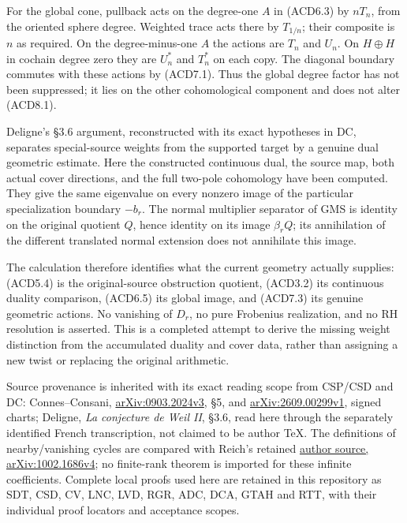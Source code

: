 For the global cone, pullback acts on the degree-one \(A\) in (ACD6.3)
by \(nT_n\), from the oriented sphere degree. Weighted trace acts there
by \(T_{1/n}\); their composite is \(n\) as required. On the
degree-minus-one \(A\) the actions are \(T_n\) and \(U_n\). On
\(H\oplus H\) in cochain degree zero they are \(U_n^*\) and \(T_n^*\) on
each copy. The diagonal boundary commutes with these actions by
(ACD7.1). Thus the global degree factor has not been suppressed; it lies
on the other cohomological component and does not alter (ACD8.1).

Deligne's §3.6 argument, reconstructed with its exact hypotheses in DC,
separates special-source weights from the supported target by a genuine
dual geometric estimate. Here the constructed continuous dual, the
source map, both actual cover directions, and the full two-pole
cohomology have been computed. They give the same eigenvalue on every
nonzero image of the particular specialization boundary \(-b_r\). The
normal multiplier separator of GMS is identity on the original quotient
\(Q\), hence identity on its image \(\beta_rQ\); its annihilation of the
different translated normal extension does not annihilate this image.

The calculation therefore identifies what the current geometry actually
supplies: (ACD5.4) is the original-source obstruction quotient, (ACD3.2)
its continuous duality comparison, (ACD6.5) its global image, and
(ACD7.3) its genuine geometric actions. No vanishing of \(D_r\), no pure
Frobenius realization, and no RH resolution is asserted. This is a
completed attempt to derive the missing weight distinction from the
accumulated duality and cover data, rather than assigning a new twist or
replacing the original arithmetic.

Source provenance is inherited with its exact reading scope from CSP/CSD
and DC: Connes--Consani,
\href{https://arxiv.org/abs/0903.2024v3}{arXiv:0903.2024v3}, §5, and
\href{https://arxiv.org/abs/2609.00299v1}{arXiv:2609.00299v1}, signed
charts; Deligne, \emph{La conjecture de Weil II}, §3.6, read here
through the separately identified French transcription, not claimed to
be author TeX. The definitions of nearby/vanishing cycles are compared
with Reich's retained \href{https://arxiv.org/abs/1002.1686v4}{author
source, arXiv:1002.1686v4}; no finite-rank theorem is imported for these
infinite coefficients. Complete local proofs used here are retained in
this repository as SDT, CSD, CV, LNC, LVD, RGR, ADC, DCA, GTAH and RTT,
with their individual proof locators and acceptance scopes.
